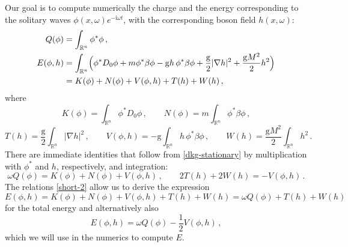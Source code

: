 \documentclass[12pt]{extarticle}
\newcommand{\coupling}{\mathrm{g}}
\newcommand{\jj}{\mathrm{i}}
\def\R{\mathbb{R}}
\newcommand{\abs}[1]{\vert #1 \vert}
\theoremstyle{plain}
\theoremstyle{remark}
\begin{document}
Our goal is to compute numerically
the charge and the energy
corresponding to the solitary waves
$\phi(x,\omega)e^{-\jj\omega t}$,
with the corresponding boson field
$h(x,\omega)$:
\begin{align}\label{def-Q}
    Q(\phi)
    &=\int_{\R^n}\phi^*\phi\,,
    \\
    E(\phi,h)
    &=\int_{\R^n}
    \Bigl(\phi^*D_0\phi
    +m \phi^*\beta\phi
    -\coupling h\,\phi^*\beta\phi
    +
    \frac{\coupling}{2}\abs{\nabla h}^2
    +\frac{\coupling M^2}{2}h^2
    \Bigr)
    \nonumber
    \\
    &=K(\phi)+N(\phi)+V(\phi,h)
    +T(h)+W(h)\,,
\end{align}
where
\begin{equation}
\label{def-kn}
    K(\phi)
    =\int_{\R^n}
    \phi^* D_0\phi\,,
    \qquad
    N(\phi)
    =m\int_{\R^n} \phi^*\beta\phi\,,
\end{equation}
\begin{equation}\label{def-tvw}
    T(h)=\frac{\coupling}{2}
    \int_{\R^n} \abs{\nabla h}^2\,,
    \qquad
    V(\phi,h)=-\coupling\int_{\R^n} h\,\phi^*\beta\phi\,,
    \qquad
    W(h)=\frac{\coupling M^2}{2}\int_{\R^n} h^2\,.
\end{equation}
There are 
immediate identities
that follow from
\eqref{dkg-stationary}
by multiplication with
$\phi^*$ and $h$,
respectively, and integration:
\begin{equation}\label{short-2}
    \omega Q(\phi)
    =K(\phi)+N(\phi)+V(\phi,h)\,,
    \qquad
    2T(h)+2W(h)=-V(\phi,h)\,.
\end{equation}
The relations
\eqref{short-2}
allow us
to derive the
expression
\begin{equation}\label{dkg-energy}
    E(\phi,h) = K(\phi)+N(\phi)+V(\phi,h)+T(h)+W(h) =\omega Q(\phi)+T(h)+W(h)
\end{equation}
for the total energy and alternatively also
\begin{equation}
\label{dkg-energy-no-derivatives}
    E(\phi,h) =\omega Q(\phi)-\frac{1}{2}V(\phi,h)\,,
\end{equation}
which we will use in the numerics to compute $E$.
\end{document}
